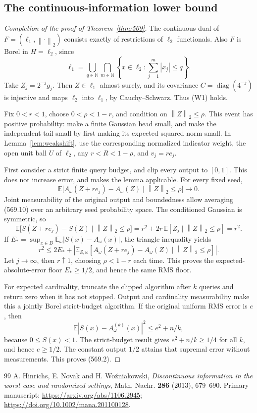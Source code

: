 \documentclass[11pt,a4paper]{article}
\newcommand{\N}{\mathbb N}
\newcommand{\E}{\mathbb E}
\newcommand{\norm}[1]{\left\lVert#1\right\rVert}
\newcommand{\abs}[1]{\left\lvert#1\right\rvert}
\theoremstyle{definition}
\theoremstyle{remark}
\numberwithin{equation}{section}
\begin{document}
\subsection{The continuous-information lower bound}

\begin{proof}[Completion of the proof of Theorem~\ref{thm:569}]
The continuous dual of \(F=(\ell_1,\norm{\cdot}_2)\) consists exactly
of restrictions of \(\ell_2\) functionals. Also \(F\) is Borel in
\(H=\ell_2\), since
\[
 \ell_1=\bigcup_{q\in\N}\bigcap_{m\in\N}
       \left\{x\in\ell_2:\sum_{j=1}^m\abs{x_j}\le q\right\}.
 \tag{569.9}
\]
Take \(Z_j=2^{-j}g_j\). Then \(Z\in\ell_1\) almost surely, and its
covariance \(C=\operatorname{diag}(4^{-j})\) is injective and maps
\(\ell_2\) into \(\ell_1\), by Cauchy--Schwarz. Thus (W1) holds.

Fix \(0<r<1\), choose \(0<\rho<1-r\), and condition on
\(\norm Z_2\le\rho\). This event has positive probability: make a
finite Gaussian head small, and make the independent tail small by
first making its expected squared norm small. In
Lemma~\ref{lem:weakshift}, use the corresponding normalized indicator
weight, the open unit ball \(U\) of \(\ell_2\), any
\(r<R<1-\rho\), and \(v_j=re_j\).

First consider a strict finite query budget, and clip every output
to \([0,1]\). This does not increase error, and makes the lemma
applicable. For every fixed seed,
\[
 \E\bigl[A_\omega(Z+re_j)-A_\omega(Z)
                 \mid\norm Z_2\le\rho\bigr]\longrightarrow0.
 \tag{569.10}
\]
Joint measurability of the original output and boundedness allow
averaging (569.10) over an arbitrary seed probability space.
The conditioned Gaussian is symmetric, so
\[
 \E\bigl[S(Z+re_j)-S(Z)\mid\norm Z_2\le\rho\bigr]
       =r^2+2r\,\E[Z_j\mid\norm Z_2\le\rho]=r^2 .
 \tag{569.11}
\]
If \(E_*=\sup_{x\in B}\E_\omega\abs{S(x)-A_\omega(x)}\), the
triangle inequality yields
\[
 r^2\le 2E_*+
       \abs{\E_{Z,\omega}
             [A_\omega(Z+re_j)-A_\omega(Z)\mid\norm Z_2\le\rho]} .
 \tag{569.12}
\]
Let \(j\to\infty\), then \(r\uparrow1\), choosing \(\rho<1-r\)
each time. This proves the expected-absolute-error floor \(E_*\ge1/2\),
and hence the same RMS floor.

For expected cardinality, truncate the clipped algorithm after \(k\)
queries and return zero when it has not stopped. Output and
cardinality measurability make this a jointly Borel strict-budget
algorithm. If the original uniform RMS error is \(e\), then
\[
        \E\abs{S(x)-A^{(k)}_\omega(x)}^2\le e^2+n/k ,
 \tag{569.13}
\]
because \(0\le S(x)<1\). The strict-budget result gives
\(e^2+n/k\ge1/4\) for all \(k\), and hence \(e\ge1/2\).
The constant output \(1/2\) attains that supremal error without
measurements. This proves (569.2).
\end{proof}


\begin{thebibliography}{99}
A. Hinrichs, E. Novak and H. Wo\'zniakowski, \emph{Discontinuous information in the worst case and randomized settings}, Math. Nachr. \textbf{286} (2013), 679--690. Primary manuscript: \url{https://arxiv.org/abs/1106.2945}; \url{https://doi.org/10.1002/mana.201100128}.
\end{thebibliography}
\end{document}

